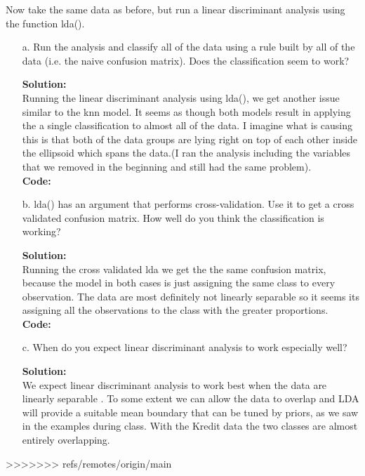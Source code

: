 \documentclass[12pt]{article}
\makeatletter
\theoremstyle{homework}
\newenvironment{exercise}[1]
{\def\@currentlabel{#1}\exercisecore}
{\endexercisecore}
\newcommand{\localhead}[1]{\par\smallskip\noindent\textbf{#1}\nobreak\\}%
\newcommand\solution{\localhead{Solution:}}
\makeatother
\begin{document}
\begin{exercise}{2.} Now take the same data as before, but run a linear discriminant analysis using the function lda().\\
  \begin{enumerate}
    \item[a.] Run the analysis and classify all of the data using a rule built by all of the data (i.e. the naive confusion matrix). Does the classification seem
    to work?\\
    \solution Running the linear discriminant analysis using lda(), we get another issue similar to the knn model. It seems as though both models result in applying the a single classification to almost all of 
    the data. I imagine what is causing this is that both of the data groups are lying right on top of each other inside the ellipsoid which spans the data.(I ran the analysis including the variables that we removed in the beginning and still had the same problem). \\
    \textbf{Code:}
      \begin{center}
      
      \end{center}
    \vspace{.15in}

    \item[b.] lda() has an argument that performs cross-validation. Use it to get a cross validated confusion matrix. How well do you think the classification
    is working?\\
    \solution Running the cross validated lda we get the the same confusion matrix, because the model in both cases is just assigning the same class to every observation. The data are most definitely not linearly separable
    so it seems its assigning all the observations to the class with the greater proportions.\\
    \textbf{Code:}
      \begin{center}
      
      \end{center}
    \vspace{.15in}

    \item[c.] When do you expect linear discriminant analysis to work especially well?\\
    \solution We expect linear discriminant analysis to work best when the data are linearly separable . To some extent we can allow the data to overlap and 
    LDA will provide a suitable mean boundary that can be tuned by priors, as we saw in the examples during class. With the Kredit data the two classes are almost entirely overlapping. 
  \end{enumerate} 
>>>>>>> refs/remotes/origin/main
\end{exercise}
\end{document}

